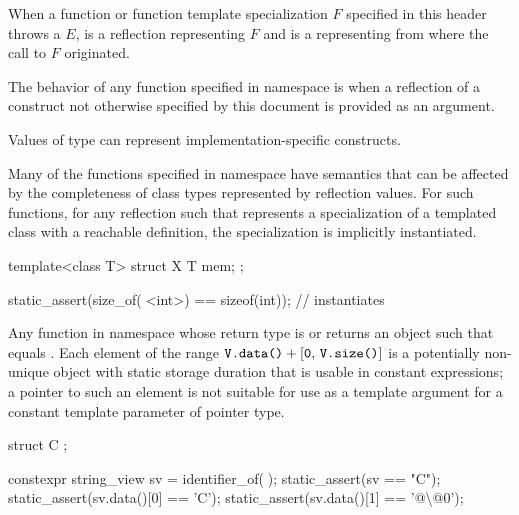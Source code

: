\pnum
When a function or function template specialization $F$ specified in this header
throws a  $E$,
 is a reflection representing $F$ and
 is a 
representing from where the call to $F$ originated.

\pnum
The behavior of any function specified in namespace  is
when a reflection of a construct not otherwise specified by this document
is provided as an argument.
\begin{note}
Values of type 
can represent implementation-specific constructs.
\end{note}
\begin{note}
Many of the functions specified in namespace 
have semantics that can be affected by
the completeness of class types represented by reflection values.
For such functions,
for any reflection  such that 
represents a specialization of a templated class with a reachable definition,
the specialization is implicitly instantiated.
\begin{example}
\begin{codeblock}
template<class T>
struct X {
  T mem;
};

static_assert(size_of(^^X<int>) == sizeof(int));    // instantiates 
\end{codeblock}
\end{example}
\end{note}

\pnum
Any function in namespace 
whose return type is  or 
returns an object  such that
 equals .
Each element of the range
$\tcode{V.data()} + \crange{0}{\tcode{V.size()}}$
is a potentially non-unique object with static storage duration that
is usable in constant expressions;
a pointer to such an element is not suitable for use as
a template argument for a constant template parameter of
pointer type.
\begin{example}
\begin{codeblock}
struct C { };

constexpr string_view sv = identifier_of(^^C);
static_assert(sv == "C");
static_assert(sv.data()[0] == 'C');
static_assert(sv.data()[1] == '@\textbackslash{}@0');
\end{codeblock}
\end{example}

